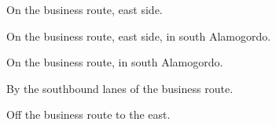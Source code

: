
\begin{LocationList}

On the business route, east side.

On the business route, east side, in south Alamogordo.

On the business route, in south Alamogordo.

By the southbound lanes of the business route.

Off the business route to the east.

\end{LocationList}

